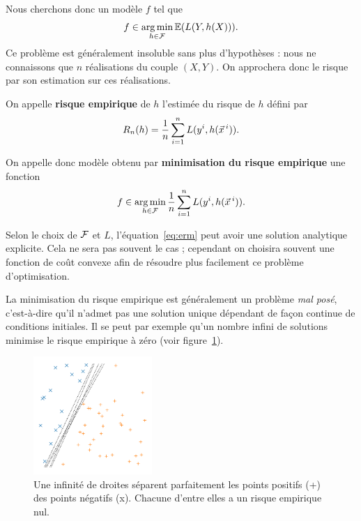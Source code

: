 Nous cherchons donc un modèle $f$ tel que 
\begin{equation}
  \label{eq:risk_minimization}
  f \in \operatorname*{arg\,min}_{h \in \mathcal{F}} \mathbb{E}(L(Y, h(X))).
\end{equation}
Ce problème est généralement insoluble sans plus d'hypothèses : nous ne
connaissons que $n$ réalisations du couple $(X, Y)$.  On approchera donc le
risque par son estimation sur ces réalisations.

On appelle \textbf{risque empirique} de $h$ l'estimée du risque de $h$ défini par
\begin{equation}
  \label{eq:empirical_risk}
  R_n(h) = \frac{1}{n} \sum_{i=1}^n L(y^i, h(\xx^i)).
\end{equation}

On appelle donc modèle obtenu par \textbf{minimisation du risque empirique} une
fonction
\begin{equation}
  \label{eq:erm}
  f \in \argmin_{h \in \FF} \frac{1}{n} \sum_{i=1}^n L(y^i, h(\xx^i)).
\end{equation}

Selon le choix de $\mathcal{F}$ et $L$, l'équation~\ref{eq:erm} peut avoir une solution
analytique explicite. Cela ne sera pas souvent le cas ; cependant on choisira
souvent une fonction de coût convexe afin de résoudre plus facilement ce
problème d'optimisation.

La minimisation du risque empirique est généralement un problème {\it mal
  posé}, c'est-à-dire qu'il n'admet pas une solution unique dépendant de façon
continue de conditions initiales. Il se peut par exemple qu'un nombre infini
de solutions minimise le risque empirique à zéro (voir
figure~\ref{fig:multiple_solutions}).

\begin{figure}[h]
  \centering
  \includegraphics[width=0.4\textwidth]{figures/erm/multiple_solutions}
  \caption{Une infinité de droites séparent parfaitement les points positifs
    (+) des points négatifs (x). Chacune d'entre elles a un risque empirique
    nul.}
  \label{fig:multiple_solutions}
\end{figure}


